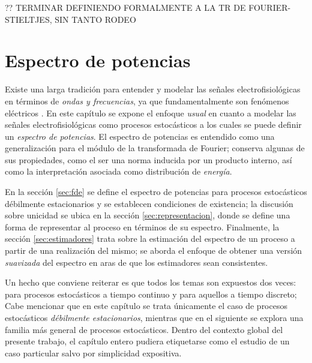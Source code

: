 \documentclass[12pt,letterpaper,draft]{book}
\begin{document}
?? TERMINAR DEFINIENDO FORMALMENTE A LA TR DE FOURIER-STIELTJES, SIN TANTO RODEO



\chapter{Espectro de potencias}

Existe una larga tradición para entender y modelar las señales electrofisiológicas en términos de \textit{ondas y frecuencias}, ya que fundamentalmente son fenómenos eléctricos \cite{Kaiser00}.
%
En este capítulo se expone el enfoque \textit{usual} en cuanto a modelar las señales electrofisiológicas como procesos estocásticos a los cuales se puede definir un \textit{espectro de potencias}.
%
El espectro de potencias es entendido como una generalización para el módulo de la transformada de Fourier; conserva algunas de sus propiedades, como el ser una norma inducida por un producto interno, así como la interpretación asociada como distribución de \textit{energía}.

En la sección \ref{sec:fde} se define el espectro de potencias para procesos estocásticos débilmente estacionarios y se establecen condiciones de existencia; la discusión sobre unicidad se ubica en la sección \ref{sec:representacion}, donde se define una forma de representar al proceso en términos de su espectro.
%
Finalmente, la sección \ref{sec:estimadores} trata sobre la estimación del espectro de un proceso a partir de una realización del mismo; se aborda el enfoque de obtener una versión \textit{suavizada} del espectro en aras de que los estimadores sean consistentes.

Un hecho que conviene reiterar es que todos los temas son expuestos dos veces: para procesos estocásticos a tiempo continuo y para aquellos a tiempo discreto; 
%
Cabe mencionar que en este capítulo se trata únicamente el caso de procesos estocásticos \textit{débilmente estacionarios}, mientras que en el siguiente se explora una familia más general de procesos estocásticos.
%
Dentro del contexto global del presente trabajo, el capítulo entero pudiera etiquetarse como el estudio de un caso particular salvo por simplicidad expositiva.
\end{document}
